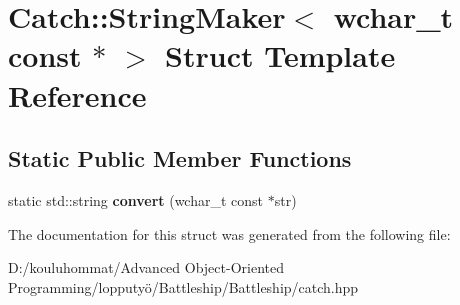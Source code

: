 \hypertarget{struct_catch_1_1_string_maker_3_01wchar__t_01const_01_5_01_4}{}\section{Catch\+:\+:String\+Maker$<$ wchar\+\_\+t const $\ast$ $>$ Struct Template Reference}
\label{struct_catch_1_1_string_maker_3_01wchar__t_01const_01_5_01_4}
\subsection*{Static Public Member Functions}
\begin{DoxyCompactItemize}
\item 
\mbox{\label{struct_catch_1_1_string_maker_3_01wchar__t_01const_01_5_01_4_ae7535a1f417ace45ca05e4389334ffeb}} 
static std\+::string {\bfseries convert} (wchar\+\_\+t const $\ast$str)
\end{DoxyCompactItemize}


The documentation for this struct was generated from the following file\+:\begin{DoxyCompactItemize}
\item 
D\+:/kouluhommat/\+Advanced Object-\/\+Oriented Programming/lopputyö/\+Battleship/\+Battleship/catch.\+hpp\end{DoxyCompactItemize}
